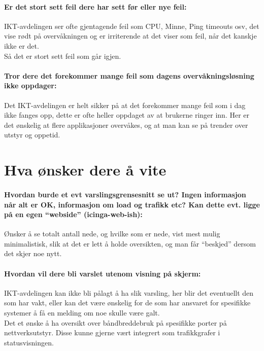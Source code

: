 \paragraph{Er det stort sett feil dere har sett før eller nye feil:}
IKT-avdelingen ser ofte gjentagende feil som CPU, Minne, Ping timeouts osv, det vise rødt på overvåkningen og er irriterende at det viser som feil, når det kanskje ikke er det. \\

\noindent Så det er stort sett feil som går igjen.

\paragraph{Tror dere det forekommer mange feil som dagens overvåkningsløsning ikke oppdager:}
Det IKT-avdelingen er helt sikker på at det forekommer mange feil som i dag ikke fanges opp, dette er ofte heller oppdaget av at brukerne ringer inn. Her er det ønskelig at flere applikasjoner overvåkes, og at man kan se på trender over utstyr og oppetid.
\section{Hva ønsker dere å vite}
\paragraph{Hvordan burde et evt varslingsgrensesnitt se ut? Ingen informasjon når alt er OK, informasjon om load og trafikk etc? Kan dette evt. ligge på en egen “webside” (icinga-web-ish):}
Ønsker å se totalt antall nede, og hvilke som er nede, vist mest mulig minimalistisk, slik at det er lett å holde oversikten, og man får “beskjed” dersom det skjer noe nytt.
\paragraph{Hvordan vil dere bli varslet utenom visning på skjerm:}
IKT-avdelingen kan ikke bli pålagt å ha slik varsling, her blir det eventuellt den som har vakt, eller kan det være ønskelig for de som har ansvaret for spesifikke systemer å få en melding om noe skulle være galt.\\

\noindent Det et ønske å ha oversikt over båndbreddebruk på spesifikke porter på nettverksutstyr. Disse kunne gjerne vært integrert som trafikkgrafer i statusvisningen.


